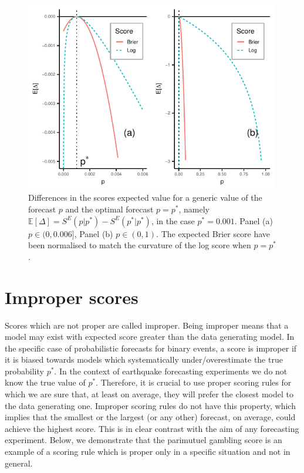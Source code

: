 \documentclass[referee,sn-basic]{sn-jnl}
\theoremstyle{thmstyleone}%
\theoremstyle{thmstyletwo}%
\theoremstyle{thmstylethree}%
\begin{document}
\begin{figure}
  \includegraphics[width = 0.99\textwidth]{figure1.pdf}
\caption{Differences in the scores expected value for a generic value of the forecast $p$ and the optimal forecast $p = p^*$, namely $\mathbb E[\Delta] = S^E(p\vert p^*) - S^E(p^*\vert p^*)$, in the case $p^* = 0.001$. Panel (a) $p \in (0,0.006]$, Panel (b) $p \in (0, 1)$. The expected Brier score have been normalised to match the curvature of the log score when $p = p^*$.}
\label{fig:1}       
\end{figure}

\section{Improper scores}
\label{sec:improper}

Scores which are not proper are called improper. Being improper means that a model may exist with expected score greater than the data generating model. In the specific case of probabilistic forecasts for binary events, a score is improper if it is biased towards models which systematically under/overestimate the true probability $p^*$. In the context of earthquake forecasting experiments we do not know the true value of $p^*$. Therefore, it is crucial to use proper scoring rules for which we are sure that, at least on average, they will prefer the closest model to the data generating one. Improper scoring rules do not have this property, which implies that the smallest or the largest (or any other) forecast, on average, could achieve the highest score. This is in clear contrast with the aim of any forecasting experiment. Below, we demonstrate that the parimutuel gambling score \citep{zhuang2010, zechar2014} is an example of a scoring rule which is proper only in a specific situation and not in general.  
\end{document}
